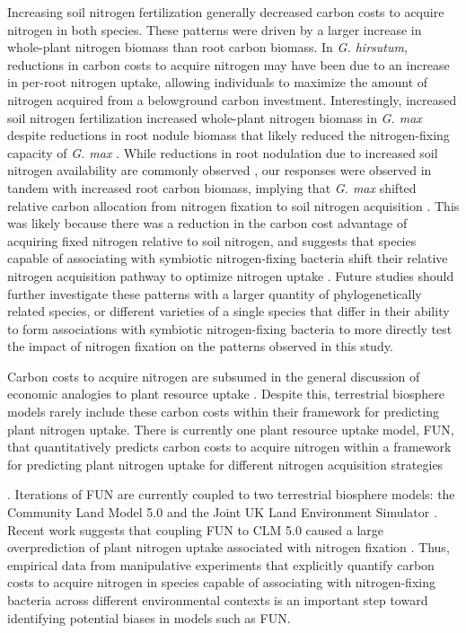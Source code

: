 Increasing soil nitrogen fertilization generally decreased carbon costs to acquire nitrogen in both species. These patterns were driven by a larger increase in whole-plant nitrogen biomass than root carbon biomass. In \textit{G. hirsutum}, reductions in carbon costs to acquire nitrogen may have been due to an increase in per-root nitrogen uptake, allowing individuals to maximize the amount of nitrogen acquired from a belowground carbon investment. Interestingly, increased soil nitrogen fertilization increased whole-plant nitrogen biomass in \textit{G. max} despite reductions in root nodule biomass that likely reduced the nitrogen-fixing capacity of \textit{G. max} . While reductions in root nodulation due to increased soil nitrogen availability are commonly observed , our responses were observed in tandem with increased root carbon biomass, implying that \textit{G. max} shifted relative carbon allocation from nitrogen fixation to soil nitrogen acquisition . This was likely because there was a reduction in the carbon cost advantage of acquiring fixed nitrogen relative to soil nitrogen, and suggests that species capable of associating with symbiotic nitrogen-fixing bacteria shift their relative nitrogen acquisition pathway to optimize nitrogen uptake . Future studies should further investigate these patterns with a larger quantity of phylogenetically related species, or different varieties of a single species that differ in their ability to form associations with symbiotic nitrogen-fixing bacteria to more directly test the impact of nitrogen fixation on the patterns observed in this study.

Carbon costs to acquire nitrogen are subsumed in the general discussion of economic analogies to plant resource uptake . Despite this, terrestrial biosphere models rarely include these carbon costs within their framework for predicting plant nitrogen uptake. There is currently one plant resource uptake model, FUN, that quantitatively predicts carbon costs to acquire nitrogen within a framework for predicting plant nitrogen uptake for different nitrogen acquisition strategies 

. Iterations of FUN are currently coupled to two terrestrial biosphere models: the Community Land Model 5.0 and the Joint UK Land Environment Simulator . Recent work suggests that coupling FUN to CLM 5.0 caused a large overprediction of plant nitrogen uptake associated with nitrogen fixation . Thus, empirical data from manipulative experiments that explicitly quantify carbon costs to acquire nitrogen in species capable of associating with nitrogen-fixing bacteria across different environmental contexts is an important step toward identifying potential biases in models such as FUN.

